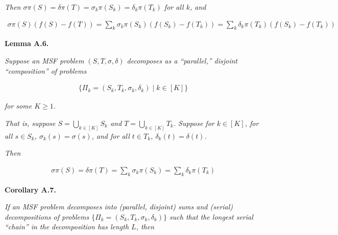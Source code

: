 \documentclass[10pt,a4paper]{article}
\begin{document}
\emph{Then
$\sigma\pi(S)=\delta\pi(T)=\sigma_{k}\pi(S_{k})=\delta_{k}\pi(T_{k})$ for all $k$, and}\par


\[\begin{gathered}
\sigma\pi(S)(f(S)-f(T))=\sum_{k}\sigma_{k}\pi(S_{k})(f(S_{k})-f(T_{k}))=\sum_{k}\delta_{k}\pi(T_{k})(f(S_{k})-f(T_{k}))
\end{gathered}\]







\par\medskip\noindent\textbf{\textbf{Lemma A.6}\textbf{.}}\par



\emph{Suppose an MSF problem $(S,T,\sigma,\delta)$ decomposes as a “parallel,” disjoint “composition” of problems}\par


\[\begin{gathered}
\{\Pi_{k}=(S_{k},T_{k},\sigma_{k},\delta_{k})\mid k\in[K]\}
\end{gathered}\]


\emph{for some $K\geq 1$.}\par




\emph{That is, suppose $S=\bigcup_{k\in[K]}S_{k}$ and $T=\bigcup_{k\in[K]}T_{k}$. Suppose for $k\in[K]$, for all $s\in S_{k}$, $\sigma_{k}(s)=\sigma(s)$, and for all $t\in T_{k}$, $\delta_{k}(t)=\delta(t)$.}\par




\emph{Then}\par


\[\begin{gathered}
\sigma\pi(S)=\delta\pi(T)=\sum_{k}\sigma_{k}\pi(S_{k})=\sum_{k}\delta_{k}\pi(T_{k})
\end{gathered}\]







\par\medskip\noindent\textbf{\textbf{Corollary A.7}\textbf{.}}\par



\emph{If an MSF problem decomposes into (parallel, disjoint) sums and (serial) decompositions of problems $\{\Pi_{k}=(S_{k},T_{k},\sigma_{k},\delta_{k})\}$ such that the longest serial “chain” in the decomposition has length $L$, then}\par
\end{document}
